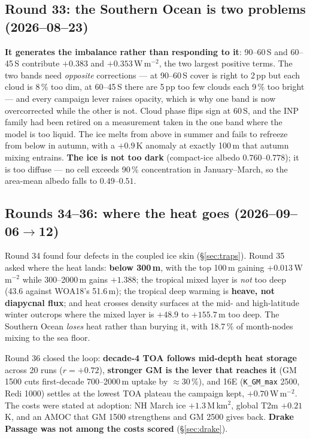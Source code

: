 \documentclass[10pt]{article}
\begin{document}
\subsection{Round 33: the Southern Ocean is two problems (2026--08--23)}

\textbf{It generates the imbalance rather than responding to it}: 90--60\,S and 60--45\,S
contribute $+0.383$ and $+0.353$\,W\,m$^{-2}$, the two largest positive terms. The two bands
need \emph{opposite} corrections --- at 90--60\,S cover is right to 2\,pp but each cloud is
8\,\% too dim, at 60--45\,S there are 5\,pp too few clouds each 9\,\% too bright --- and
every campaign lever raises opacity, which is why one band is now overcorrected while the
other is not. Cloud phase flips sign at 60\,S, and the INP family had been retired on a
measurement taken in the one band where the model is too liquid. The ice melts from above
in summer and fails to refreeze from below in autumn, with a $+0.9$\,K anomaly at exactly
100\,m that autumn mixing entrains. \textbf{The ice is not too dark} (compact-ice albedo
$0.760$--$0.778$); it is too diffuse --- no cell exceeds 90\,\% concentration in
January--March, so the area-mean albedo falls to $0.49$--$0.51$.

\subsection{Rounds 34--36: where the heat goes (2026--09--06$\to$12)}

Round 34 found four defects in the coupled ice skin (\S\ref{sec:traps}). Round 35 asked
where the heat lands: \textbf{below 300\,m}, with the top
100\,m gaining $+0.013$\,W\,m$^{-2}$ while 300--2000\,m gains $+1.388$; the tropical mixed
layer is \emph{not} too deep (43.6 against WOA18's 51.6\,m); the tropical deep warming is
\textbf{heave, not diapycnal flux}; and heat crosses density surfaces at the mid- and
high-latitude winter outcrops where the mixed layer is $+48.9$ to $+155.7$\,m too deep. The
Southern Ocean \emph{loses} heat rather than burying it, with 18.7\,\% of month-nodes mixing
to the sea floor.

Round 36 closed the loop: \textbf{decade-4 TOA follows mid-depth heat storage} across 20
runs ($r=+0.72$), \textbf{stronger GM is the lever that reaches it} (GM 1500 cuts first-decade
700--2000\,m uptake by ${\approx}30\,\%$), and 16E (\texttt{K\_GM\_max} 2500, Redi 1000)
settles at the lowest TOA plateau the campaign kept, $+0.70$\,W\,m$^{-2}$. The costs were
stated at adoption: NH March ice $+1.3$\,M\,km$^2$, global T2m $+0.21$\,K, and an AMOC that
GM 1500 strengthens and GM 2500 gives back. \textbf{Drake Passage was not among the costs
scored} (\S\ref{sec:drake}).
\end{document}
